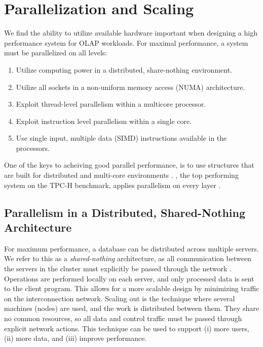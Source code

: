 \chapter{Parallelization and Scaling}
\label{chap:Parallelization and Scaling}

We find the ability to utilize available hardware important when designing a high performance system for OLAP workloads. For maximal performance, a system must be parallelized on all levels:

\begin{enumerate}
  \item Utilize computing power in a distributed, share-nothing environment.
  \item Utilize all sockets in a non-uniform memory access (NUMA) architecture.
  \item Exploit thread-level parallelism within a multicore processor.
  \item Exploit instruction level parallelism within a single core.
  \item Use single input, multiple data (SIMD) instructions available in the processors.
\end{enumerate}

One of the keys to acheiving good parallel performance, is to use structures that are built for distributed and multi-core environments \cite{Primsch2011-ij}. \exasol, the top performing system on the TPC-H benchmark, applies parallelism on every layer \cite{Exasol2014-xh}.

\newpage

\section{Parallelism in a Distributed, Shared-Nothing Architecture}
\label{sec:Parallelism in a Distributed, Shared-Nothing Architecture}
For maximum performance, a database can be distributed across multiple servers. We refer to this as a \textit{shared-nothing} architecture, as all communication between the servers in the cluster must explicitly be passed through the network \cite{DeWitt1992-ki}. Operations are performed locally on each server, and only processed data is sent to the client program. This allows for a more scalable design by minimizing traffic on the interconnection network. Scaling out is the technique where several machines (nodes) are used, and the work is distributed between them. They share no common resources, so all data and control traffic must be passed through explicit network actions. This technique can be used to support (i) more users, (ii) more data, and (iii) improve performance.

